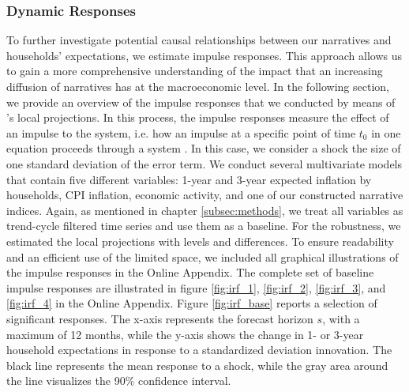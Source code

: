 \subsubsection{Dynamic Responses}

To further investigate potential causal relationships between our narratives and households' expectations, we estimate impulse responses. This approach allows us to gain a more comprehensive understanding of the impact that an increasing diffusion of narratives has at the macroeconomic level. In the following section, we provide an overview of the impulse responses that we conducted by means of \cite{Jorda.2005}'s local projections. In this process, the impulse responses measure the effect of an impulse to the system, i.e. how an impulse at a specific point of time $t_0$ in one equation proceeds through a system \citep[138]{Kirchgaesser.2007}. In this case, we consider a shock the size of one standard deviation of the error term. We conduct several multivariate models that contain five different variables: 1-year and 3-year expected inflation by households, CPI inflation, economic activity, and one of our constructed narrative indices. Again, as mentioned in chapter \ref{subsec:methods}, we treat all variables as trend-cycle filtered time series and use them as a baseline. For the robustness, we estimated the local projections with levels and differences. To ensure readability and an efficient use of the limited space, we included all graphical illustrations of the impulse responses in the Online Appendix. The complete set of baseline impulse responses are illustrated in figure \ref{fig:irf_1}, \ref{fig:irf_2}, \ref{fig:irf_3}, and \ref{fig:irf_4} in the Online Appendix. Figure \ref{fig:irf_base} reports a selection of significant responses. The x-axis represents the forecast horizon $s$, with a maximum of 12 months, while the y-axis shows the change in 1- or 3-year household expectations in response to a standardized deviation innovation. The black line represents the mean response to a shock, while the gray area around the line visualizes the 90\% confidence interval.

